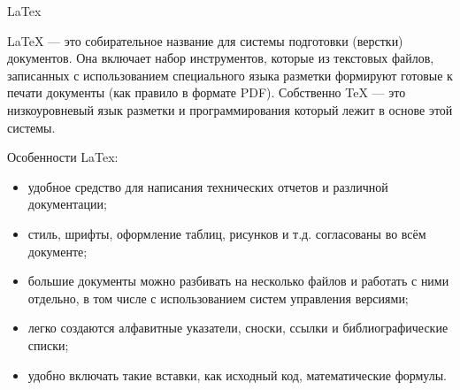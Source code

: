 \begin{center}
 LaTex
\end{center}

\vspace{\baselineskip}

LaTeX — это собирательное название для системы подготовки (верстки) документов. Она включает набор инструментов, которые из текстовых файлов, записанных с использованием специального языка разметки формируют готовые к печати документы (как правило в формате PDF). Собственно TeX — это низкоуровневый язык разметки и программирования который лежит в основе этой системы. \par
Особенности LaTex:
\begin{itemize}
\item удобное средство для написания технических отчетов и различной документации;
\item стиль, шрифты, оформление таблиц, рисунков и т.д. согласованы во всём документе;
\item большие документы можно разбивать на несколько файлов и работать с ними отдельно, в том числе с использованием систем управления версиями;
\item легко создаются алфавитные указатели, сноски, ссылки и библиографические списки;
\item удобно включать такие вставки, как исходный код, математические формулы.
\end{itemize}
\vspace{\baselineskip}

